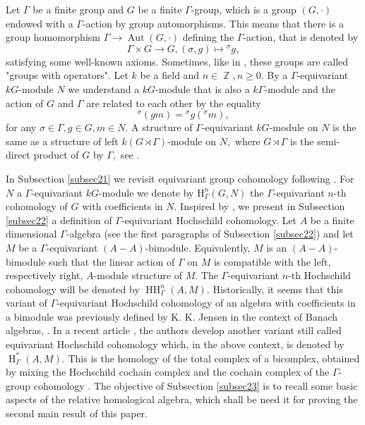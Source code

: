 \documentclass[pdflatex,sn-mathphys-num]{sn-jnl}
\numberwithin{equation}{section}
\theoremstyle{thmstyleone}
\theoremstyle{thmstyletwo}
\theoremstyle{thmstylethree}
\newcommand{\Aut}{\operatorname{Aut}}
\newcommand{\Hrm}{\operatorname{H}}
\newcommand{\HH}{\operatorname{HH}}
\newcommand{\Z}{\operatorname{\mathbb{Z}}}
\begin{document}
Let $\Gamma$ be a  finite group and $G$ be a  finite $\Gamma$-group, which is a group $(G,\cdot)$ endowed with a $\Gamma$-action by group automorphisms. This means that there is a group homomorphism $\Gamma\rightarrow \Aut(G,\cdot)$ defining  the $\Gamma$-action, that is denoted by $$\Gamma \times G \rightarrow G, (\sigma,g)\mapsto {}^{\sigma}g,$$ satisfying some well-known axioms. Sometimes, like in \citep{Ceg}, these groups are called  "groups with operators". Let $k$ be a field and $n\in \Z, n \geq 0.$ By a $\Gamma$-equivariant $kG$-module $N$ we understand a $kG$-module that is also a $k\Gamma$-module and the action of $G$ and $\Gamma$ are related to each other by the
equality $${}^{\sigma}(g m)={}^{\sigma}g({}^{\sigma} m),$$
for any $\sigma\in\Gamma, g\in G, m\in N.$ A structure of $\Gamma$-equivariant $kG$-module on $N$ is the same as a structure of left $k(G \rtimes \Gamma)$-module on $N,$ where $G \rtimes \Gamma$ is the semi-direct product of $G$ by $\Gamma,$ see \citep{Ceg}.

In Subsection \ref{subsec21} we revisit equivariant group cohomology following \cite[Section 1]{In05}. For $N$  a $\Gamma$-equivariant $kG$-module we denote by $\mathrm{H}_{\Gamma}^n(G,N)$ the $\Gamma$-equivariant $n$-th cohomology of $G$ with coefficients in $N.$ Inspired by \cite[Section 2]{Gou}, we present in Subsection \ref{subsec22}  a definition of $\Gamma$-equivariant Hochschild cohomology. Let $A$ be a finite dimensional $\Gamma$-algebra (see the first paragraphs of Subsection \ref{subsec22}) and let $M$ be a $\Gamma$-equivariant $(A-A)$-bimodule. Equivalently, $M$ is an $(A-A)$-bimodule such that the  linear action of $\Gamma$ on $M$ is compatible with the left, respectively right, $A$-module structure of $M.$  The $\Gamma$-equivariant $n$-th   Hochschild cohomology will be denoted by $\HH_{\Gamma}^n(A,M).$ Historically, it seems that this variant of $\Gamma$-equivariant Hochschild cohomology  of an algebra with coefficients in a bimodule was previously defined by K. K. Jensen in the context of Banach algebras, \cite[Definition I.1.7]{Je}. In a recent article \citep{KoPi}, the authors develop another variant still  called equivariant Hochschild cohomology which, in the above context, is denoted by $\Hrm^*_{\Gamma}(A,M).$ This is the homology of the total complex of a bicomplex, obtained by mixing the Hochschild cochain complex and the cochain complex of the $\Gamma$-group cohomology \cite[Definition 5]{KoPi}. The objective of  Subsection \ref{subsec23} is to recall some basic aspects of the relative homological algebra, which shall be need it for proving the second main result of this paper.
\end{document}

